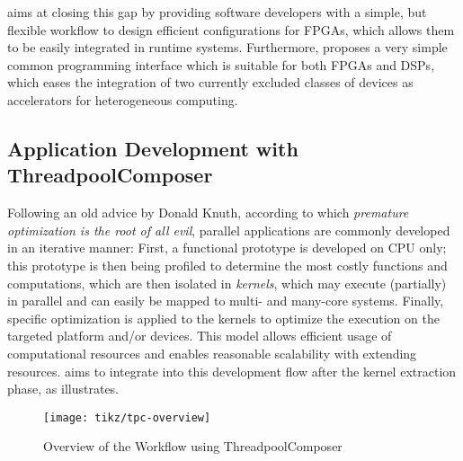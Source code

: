 \medskip
\tpc{} aims at closing this gap by providing software developers with a simple, but flexible workflow to design efficient configurations for FPGAs, which allows them to be easily integrated in runtime systems.
Furthermore, \tpc{} proposes a very simple common programming interface which is suitable for both FPGAs and DSPs, which eases the integration of two currently excluded classes of devices as accelerators for heterogeneous computing.

\subsection*{Application Development with ThreadpoolComposer}
Following an old advice by Donald Knuth, according to which \emph{premature optimization is the root of all evil}, parallel applications are commonly developed in an iterative manner:
First, a functional prototype is developed on CPU only; this prototype is then being profiled to determine the most costly functions and computations, which are then isolated in \emph{kernels}, which may execute (partially) in parallel and can easily be mapped to multi- and many-core systems.
Finally, specific optimization is applied to the kernels to optimize the execution on the targeted platform and/or devices.
This model allows efficient usage of computational resources and enables reasonable scalability with extending resources.
\tpc{} aims to integrate into this development flow after the kernel extraction phase, as  illustrates.
%
\begin{figure}%
  \centering\texttt{[image: tikz/tpc-overview]}
  \caption{Overview of the Workflow using ThreadpoolComposer}
  \label{fig:tpc-overview}
\end{figure}
%

